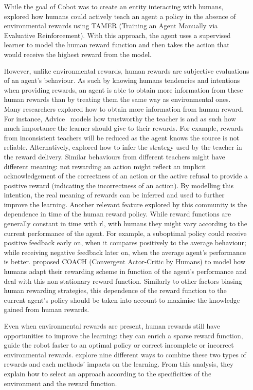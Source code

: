 While the goal of Cobot was to create an entity interacting with humans, \cite{knox2009interactively} explored how humans could actively teach an agent a policy in the absence of environmental rewards using TAMER (Training an Agent Manually via Evaluative Reinforcement). With this approach, the agent uses a supervised learner to model the human reward function and then takes the action that would receive the highest reward from the model. 

However, unlike environmental rewards, human rewards are subjective evaluations of an agent's behaviour. As such by knowing humans tendencies and intentions when providing rewards, an agent is able to obtain more information from these human rewards than by treating them the same way as environmental ones. Many researchers explored how to obtain more information from human reward. For instance, Advice~\citep{griffith2013policy} models how trustworthy the teacher is and as such how much importance the learner should give to their rewards. For example, rewards from inconsistent teachers will be reduced as the agent knows the source is not reliable. Alternatively, \cite{loftin2016learning} explored how to infer the strategy used by the teacher in the reward delivery. Similar behaviours from different teachers might have different meaning: not rewarding an action might reflect an implicit acknowledgement of the correctness of an action or the active refusal to provide a positive reward (indicating the incorrectness of an action). By modelling this intention, the real meaning of rewards can be inferred and used to further improve the learning. Another relevant feature explored by this community is the dependence in time of the human reward policy. While reward functions are generally constant in time with \gls{rl}, with humans they might vary according to the current performance of the agent. For example, a suboptimal policy could receive positive feedback early on, when it compares positively to the average behaviour; while receiving negative feedback later on, when the average agent's performance is better. \cite{macglashan2017interactive} proposed COACH (Convergent Actor-Critic by Humans) to model how humans adapt their rewarding scheme in function of the agent's performance and deal with this non-stationary reward function. Similarly to other factors biasing human rewarding strategies, this dependence of the reward function to the current agent's policy should be taken into account to maximise the knowledge gained from human rewards.

Even when environmental rewards are present, human rewards still have opportunities to improve the learning: they can enrich a sparse reward function, guide the robot faster to an optimal policy or correct incomplete or incorrect environmental rewards. \cite{knox2010combining} explore nine different ways to combine these two types of rewards and each methods' impacts on the learning. From this analysis, they explain how to select an approach according to the specificities of the environment and the reward function.


